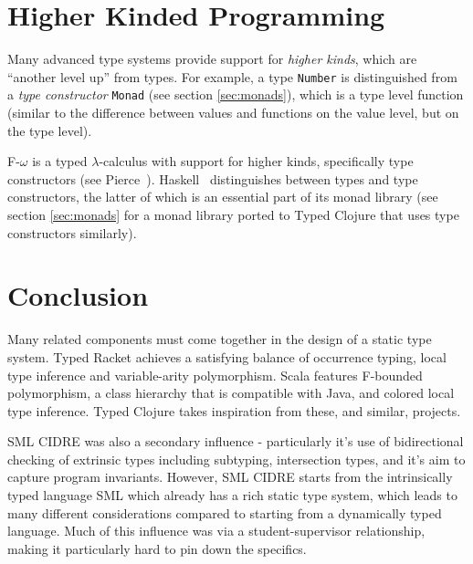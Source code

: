 \section{Higher Kinded Programming}

Many advanced type systems provide support for \emph{higher kinds},
which are ``another level up'' from types.
For example, a type \lstinline|Number| is distinguished from a
\emph{type constructor} \lstinline|Monad| (see section \ref{sec:monads}), which is a type level function
(similar to the difference between values and functions on the value level, but on the type level).

F-$\omega$ is a typed $\lambda$-calculus with support for higher kinds,
specifically type constructors (see Pierce~\cite{Pie02}).
Haskell~\cite{Mar10} distinguishes between types and type constructors,
the latter of which is an essential part of its monad library 
(see section \ref{sec:monads} for a monad library ported to Typed Clojure
that uses type constructors similarly).

\section{Conclusion}

Many related components must come together in the design of a
static type system. Typed Racket achieves a satisfying balance of 
occurrence typing, local type inference and variable-arity polymorphism.
Scala features F-bounded polymorphism, a class hierarchy
that is compatible with Java, and colored local type inference.
Typed Clojure takes inspiration from these, and similar, projects.

SML CIDRE \cite{Dav05} was also a secondary influence - particularly it's use of bidirectional 
checking of extrinsic types including subtyping, intersection types, and it's aim to capture program invariants.  
However, SML CIDRE starts from the intrinsically typed language SML which already has a rich static 
type system, which leads to many different considerations compared to starting from a dynamically typed language.  
Much of this influence was via a student-supervisor relationship, making it particularly hard to pin down the specifics.

